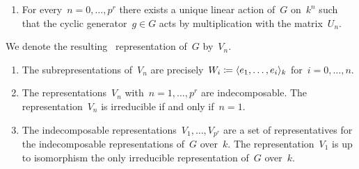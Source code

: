 \begin{proposition}
  \leavevmode
  \begin{enumerate}
    \item
      For every~$n = 0, \dotsc, p^r$ there exists a unique linear action of~$G$ on~$k^n$ such that the cyclic generator~$g \in G$ acts by multiplication with the matrix~$U_n$.
  \end{enumerate}
  We denote the resulting~ representation of~$G$ by~$V_n$.
  \begin{enumerate}[resume]
    \item
      \label{classification of subrep}
      The subrepresentations of~$V_n$ are precisely~$W_i \coloneqq \langle e_1, \dotsc, e_i\rangle_k$ for~$i = 0, \dotsc, n$.
    \item
      The representations~$V_n$ with~$n = 1, \dotsc, p^r$ are indecomposable.
      The representation~$V_n$ is irreducible if and only if~$n = 1$.
    \item
      The indecomposable representations~$V_1, \dotsc, V_{p^r}$ are a set of representatives for the {\fd} indecomposable representations of~$G$ over~$k$.
      The representation~$V_1$ is up to isomorphism the only irreducible representation of~$G$ over~$k$.
  \end{enumerate}
\end{proposition}



